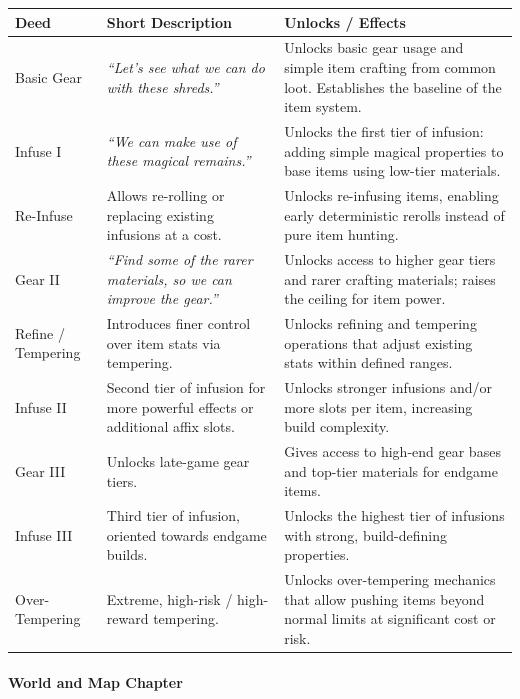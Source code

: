 \begin{center}
	\begin{tabular}{p{3.2cm}p{4cm}p{8cm}}
		\textbf{Deed} & \textbf{Short Description} & \textbf{Unlocks / Effects} \\
		\hline
		Basic Gear &
		\emph{``Let's see what we can do with these shreds.''} &
		Unlocks basic gear usage and simple item crafting from common loot. Establishes the baseline of the item system. \\
		\hline
		Infuse I &
		\emph{``We can make use of these magical remains.''} &
		Unlocks the first tier of infusion: adding simple magical properties to base items using low-tier materials. \\
		\hline
		Re-Infuse &
		Allows re-rolling or replacing existing infusions at a cost. &
		Unlocks re-infusing items, enabling early deterministic rerolls instead of pure item hunting. \\
		\hline
		Gear II &
		\emph{``Find some of the rarer materials, so we can improve the gear.''} &
		Unlocks access to higher gear tiers and rarer crafting materials; raises the ceiling for item power. \\
		\hline
		Refine / Tempering &
		Introduces finer control over item stats via tempering. &
		Unlocks refining and tempering operations that adjust existing stats within defined ranges. \\
		\hline
		Infuse II &
		Second tier of infusion for more powerful effects or additional affix slots. &
		Unlocks stronger infusions and/or more slots per item, increasing build complexity. \\
		\hline
		Gear III &
		Unlocks late-game gear tiers. &
		Gives access to high-end gear bases and top-tier materials for endgame items. \\
		\hline
		Infuse III &
		Third tier of infusion, oriented towards endgame builds. &
		Unlocks the highest tier of infusions with strong, build-defining properties. \\
		\hline
		Over-Tempering &
		Extreme, high-risk / high-reward tempering. &
		Unlocks over-tempering mechanics that allow pushing items beyond normal limits at significant cost or risk. \\
	\end{tabular}
\end{center}


\paragraph{World and Map Chapter}

